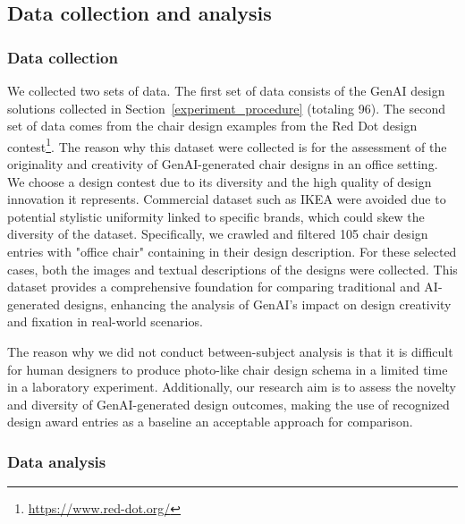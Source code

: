 \subsection{Data collection and analysis}
\subsubsection{Data collection}
We collected two sets of data. The first set of data consists of the GenAI design solutions collected in Section~\ref{experiment_procedure} (totaling 96). The second set of data comes from the chair design examples from the Red Dot design contest\footnote{\url{https://www.red-dot.org/}}. The reason why this dataset were collected is for the assessment of the originality and creativity of GenAI-generated chair designs in an office setting. We choose a design contest due to its diversity and the high quality of design innovation it represents. Commercial dataset such as IKEA were avoided due to potential stylistic uniformity linked to specific brands, which could skew the diversity of the dataset. Specifically, we crawled and filtered 105 chair design entries with "office chair" containing in their design description. For these selected cases, both the images and textual descriptions of the designs were collected. This dataset provides a comprehensive foundation for comparing traditional and AI-generated designs, enhancing the analysis of GenAI's impact on design creativity and fixation in real-world scenarios.

The reason why we did not conduct between-subject analysis is that it is difficult for human designers to produce photo-like chair design schema in a limited time in a laboratory experiment.  Additionally, our research aim is to assess the novelty and diversity of GenAI-generated design outcomes, making the use of recognized design award entries as a baseline an acceptable approach for comparison.

\subsubsection{Data analysis}

